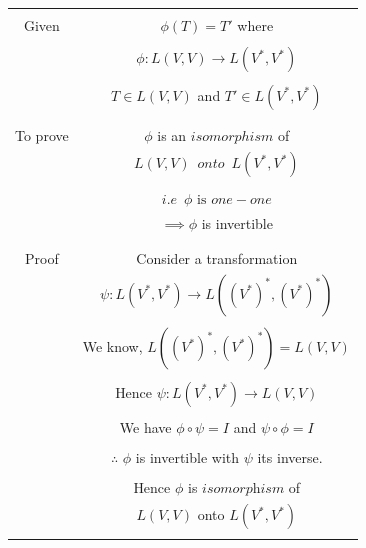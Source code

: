 \documentclass[journal,12pt,twocolumn]{IEEEtran}
\begin{document}
\begin{table}[h]
\begin{center}
\begin{tabular}{|c|c|}
\hline
& \\
Given & $\phi(T) = T'$ where\\
& \\
& $\phi : L(V,V) \rightarrow L(V^*,V^*)$\\
& \\
& $T \in L(V,V)$ and $T' \in L(V^*,V^*)$\\
& \\
\hline
& \\
To prove & $\phi$ is an $isomorphism$ of\\
& $L(V,V) \enspace onto \enspace L(V^*,V^*)$\\
& \\
& $i.e \enspace \phi \text{ is } one-one$\\
&  $\implies \phi$ is invertible\\
& \\ 
\hline
& \\
Proof & Consider a transformation\\
& $\psi : L(V^*,V^*) \rightarrow L((V^*)^*,(V^*)^*)$\\
& \\
& We know, $L((V^*)^*,(V^*)^*) = L(V,V)$\\
& \\
& Hence $\psi : L(V^*,V^*) \rightarrow L(V,V)$\\
& \\
& We have $\phi \circ \psi = I$ and $\psi \circ \phi = I$\\
& \\
& $\therefore$ $\phi$ is invertible with $\psi$ its inverse.\\
& \\
& Hence $\phi$ is $\textit{isomorphism}$ of \\
& $L(V,V)$ onto $L(V^*,V^*)$\\
& \\
\hline
\end{tabular}
\end{center}
\end{table}
\pagebreak
\end{document}

